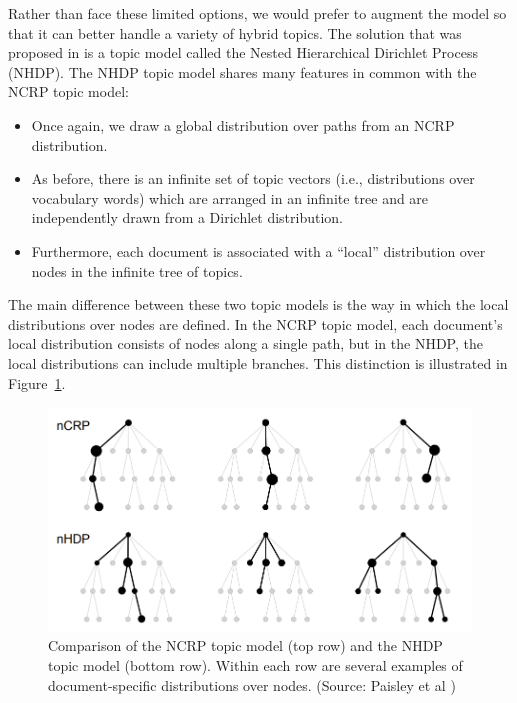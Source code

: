 \documentclass{article}
\begin{document}
Rather than face these limited options, we would prefer to augment the model so that it can better handle a variety of hybrid topics.
The solution that was proposed in \cite{paisley2015nhdp} is a topic model called the Nested Hierarchical Dirichlet Process (NHDP).
The NHDP topic model shares many features in common with the NCRP topic model:
\begin{itemize}
\item Once again, we draw a global distribution over paths from an NCRP distribution.
\item As before, there is an infinite set of topic vectors (i.e., distributions over vocabulary words) which are arranged in an infinite tree and are independently drawn from a Dirichlet distribution.
\item Furthermore, each document is associated with a ``local'' distribution over nodes in the infinite tree of topics.
\end{itemize}
The main difference between these two topic models is the way in which the local distributions over nodes are defined.
In the NCRP topic model, each document's local distribution consists of nodes along a single path, but in the NHDP, the local distributions can include multiple branches.
This distinction is illustrated in Figure~\ref{fig:ncrp-vs-nhdp}.

\begin{figure}
\centering
\includegraphics[width=0.8\linewidth]{../figures/ncrp_vs_nhdp.png}
\caption{Comparison of the NCRP topic model (top row) and the NHDP topic model (bottom row).  %
Within each row are several examples of document-specific distributions over nodes.  %
(Source: Paisley et al \cite{paisley2015nhdp})}
\label{fig:ncrp-vs-nhdp}
\end{figure}
\end{document}

